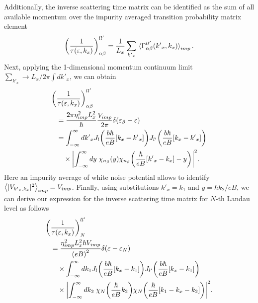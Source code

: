 Additionally, the inverse scattering time matrix can be identified as the sum of all available momentum over the impurity averaged transition probability matrix element \cite{wackerl20,wackerlthesis20}
\begin{equation} \label{eq_41}
    \qty(\frac{1}{\tau(\varepsilon,k_x)})^{ll'}_{\alpha\beta} =
    \frac{1}{L_x} \sum_{{k'}_x}
    \expval**{\Gamma_{\alpha\beta}^{ll'}({k'}_x,k_x)}_{imp}.
\end{equation}
Next, applying the 1-dimensional momentum continuum limit $\sum_{{k'}_x} \longrightarrow {L_x}/{2\pi}\int d {k'}_x$, we can obtain
\begin{equation} \label{eq_42}
  \begin{aligned}
    \bigg(&\frac{1}{\tau(\varepsilon,k_x)}\bigg)^{ll'}_{\alpha\beta} \\
    & =
    \frac { 2\pi \eta_{imp}^2 L_x^2}{ \hbar}
    \frac{V_{imp}}{2\pi}
    \delta(\varepsilon_{\beta} - \varepsilon)\\
    & =
    \int_{-\infty}^{\infty} d {k'}_x
    J_l\qty(\frac{b\hbar}{eB}[{k}_x - {k'}_x])
    J_{l'}\qty(\frac{b\hbar}{eB}[{k}_x - {k'}_x]) \\
    & \quad\times
    \qty|
    \int_{-\infty}^{\infty} dy \;
    {\chi}_{n_{\beta}}\qty(y)
    {\chi}_{n_{\beta}}\qty(\frac{\hbar}{eB} \qty[{k'}_x - {k}_x] - y)|^2.
  \end{aligned}
\end{equation}
Here an impurity average of white noise potential allows to identify $\expval{|V_{{k'}_x,k_x}|^2}_{imp} = V_{imp}$.
Finally, using substitutions $k'_x = k_1$ and $y = {\hbar{k_2}}/{eB}$, we can derive our expression for the inverse scattering time matrix for $N$-th Landau
level as follows
\begin{equation} \label{eq_43}
  \begin{aligned}
    \bigg(&\frac{1}{\tau(\varepsilon,k_x)}\bigg)^{ll'}_{N} \\
    & =
    \frac { \eta_{imp}^2 L_x^2 \hbar V_{imp}}{\qty(eB)^2}
    \delta(\varepsilon - \varepsilon_{N})\\
    & \quad\times
    \int_{-\infty}^{\infty} d k_1
    J_l\qty(\frac{b\hbar}{eB}[{k}_x - k_1])
    J_{l'}\qty(\frac{b\hbar}{eB}[{k}_x - k_1]) \\
    & \quad\times
    \qty|
    \int_{-\infty}^{\infty} dk_2 \;
    {\chi}_{N}\qty(\frac{\hbar}{eB}k_2)
    {\chi}_{N}\qty(\frac{\hbar}{eB} \qty[k_1 - {k}_x - k_2])|^2.
  \end{aligned}
\end{equation}
